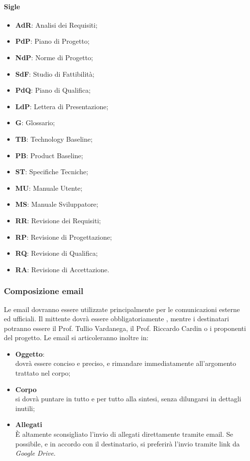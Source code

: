 	\paragraph{Sigle}
	\begin{itemize}
		\item \textbf{AdR}: Analisi dei Requisiti;
		\item \textbf{PdP}: Piano di Progetto;
		\item \textbf{NdP}: Norme di Progetto;
		\item \textbf{SdF}: Studio di Fattibilità;
		\item \textbf{PdQ}: Piano di Qualifica;
		\item \textbf{LdP}: Lettera di Presentazione;
		\item \textbf{G}: Glossario;
		\item \textbf{TB}: Technology Baseline;
		\item \textbf{PB}: Product Baseline;
		\item \textbf{ST}: Specifiche Tecniche;
		\item \textbf{MU}: Manuale Utente;
		\item \textbf{MS}: Manuale Sviluppatore;
		\item \textbf{RR}: Revisione dei Requisiti;
		\item \textbf{RP}: Revisione di Progettazione;
		\item \textbf{RQ}: Revisione di Qualifica;
		\item \textbf{RA}: Revisione di Accettazione.
	\end{itemize}
	\subsubsection{Composizione email}
	Le email dovranno essere utilizzate principalmente per le comunicazioni esterne ed ufficiali. Il mittente dovrà essere obbligatoriamente \emailgruppo,
	mentre i destinatari potranno essere il Prof. Tullio Vardanega, il Prof. Riccardo Cardin o i proponenti del progetto. Le email si articoleranno inoltre in:
	\begin{itemize}
		\item \textbf{Oggetto}:
		~\\dovrà essere conciso e preciso, e rimandare immediatamente all'argomento trattato nel corpo;
		\item \textbf{Corpo}
		~\\si dovrà puntare in tutto e per tutto alla sintesi, senza dilungarsi in dettagli inutili;
		\item \textbf{Allegati}
		~\\È altamente sconsigliato l'invio di allegati direttamente tramite email. Se possibile, e in accordo con il destinatario, si preferirà l'invio tramite link da \emph{Google Drive}.
	\end{itemize} 
	
